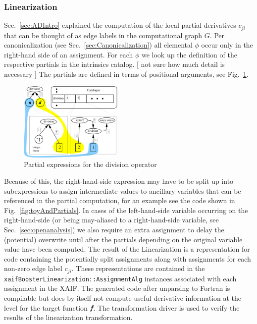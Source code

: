 \documentclass{book}
\newcommand{\xaif}{XAIF}
\newcommand{\bmf}{\mbox{\bf\em f}}
\newcommand{\refsec}[1]{{Sec.~\ref{#1}}}
\newcommand{\reffig}[1]{{Fig.~\ref{#1}}}
\begin{document}
\subsubsection{Linearization}\label{sec:linearization}

\refsec{sec:ADIntro} explained the computation of 
the local partial derivatives $c_{ji}$ that can be thought of as edge labels 
in the computational graph $G$. 
Per canonicalization (see \refsec{sec:Canonicalization}) 
all elemental $\phi$ 
occur only in the right-hand side of an assignment. 
For each $\phi$ we look up the definition of the respective partials in 
the intrinsics catalog. 
{\color{red} [ not sure  how much detail is necessary ] } 
The partials are defined in terms of positional arguments, see 
\reffig{fig:divExample}. 
\begin{figure}
  \centering \includegraphics[width=5cm]{divIntrinsic}
  \caption{Partial expressions for the division operator} \label{fig:divExample}
\end{figure}

Because of this, 
the right-hand-side expression may have to be split up into 
subexpressions to assign intermediate values to ancillary variables 
that can be referenced in the partial computation, for an example see 
the code shown in \reffig{fig:toyAndPartials}.  
In cases of the left-hand-side variable occurring on the right-hand-side 
(or being may-aliased to a right-hand-side variable, 
see \refsec{sec:openanalysis}) we also require an extra assignment to 
delay the (potential) overwrite until after the partials depending on 
the original variable value have been computed.
The result of the Linearization is a representation for 
code containing the potentially split 
assignments along with assignments for each non-zero edge label $c_{ji}$.
These representations are contained in the \lstinline{xaifBoosterLinearization::AssignmentAlg} instances associated with each assignment in the \xaif.
The generated code after unparsing to Fortran 
is compilable but does by itself not compute useful 
derivative information at the level for the target function $\bmf$. The 
transformation driver is 
used to verify the results of the linearization transformation.
\end{document}
